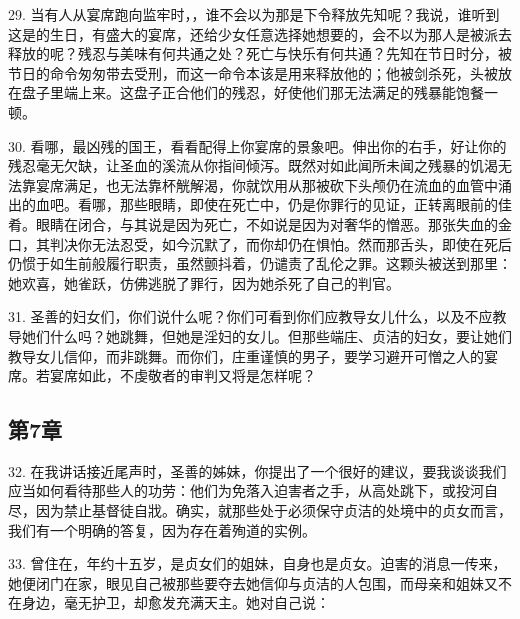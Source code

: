 29. 当有人从宴席跑向监牢时，，谁不会以为那是下令释放先知呢？我说，谁听到这是的生日，有盛大的宴席，还给少女任意选择她想要的，会不以为那人是被派去释放的呢？残忍与美味有何共通之处？死亡与快乐有何共通？先知在节日时分，被节日的命令匆匆带去受刑，而这一命令本该是用来释放他的；他被剑杀死，头被放在盘子里端上来。这盘子正合他们的残忍，好使他们那无法满足的残暴能饱餐一顿。\par

30. 看哪，最凶残的国王，看看配得上你宴席的景象吧。伸出你的右手，好让你的残忍毫无欠缺，让圣血的溪流从你指间倾泻。既然对如此闻所未闻之残暴的饥渴无法靠宴席满足，也无法靠杯觥解渴，你就饮用从那被砍下头颅仍在流血的血管中涌出的血吧。看哪，那些眼睛，即使在死亡中，仍是你罪行的见证，正转离眼前的佳肴。眼睛在闭合，与其说是因为死亡，不如说是因为对奢华的憎恶。那张失血的金口，其判决你无法忍受，如今沉默了，而你却仍在惧怕。然而那舌头，即使在死后仍惯于如生前般履行职责，虽然颤抖着，仍谴责了乱伦之罪。这颗头被送到那里：她欢喜，她雀跃，仿佛逃脱了罪行，因为她杀死了自己的判官。\par

31. 圣善的妇女们，你们说什么呢？你们可看到你们应教导女儿什么，以及不应教导她们什么吗？她跳舞，但她是淫妇的女儿。但那些端庄、贞洁的妇女，要让她们教导女儿信仰，而非跳舞。而你们，庄重谨慎的男子，要学习避开可憎之人的宴席。若宴席如此，不虔敬者的审判又将是怎样呢？\par


\subsection{第7章}

\par

32. 在我讲话接近尾声时，圣善的姊妹，你提出了一个很好的建议，要我谈谈我们应当如何看待那些人的功劳：他们为免落入迫害者之手，从高处跳下，或投河自尽，因为禁止基督徒自戕。确实，就那些处于必须保守贞洁的处境中的贞女而言，我们有一个明确的答复，因为存在着殉道的实例。\par

33. 曾住在，年约十五岁，是贞女们的姐妹，自身也是贞女。迫害的消息一传来，她便闭门在家，眼见自己被那些要夺去她信仰与贞洁的人包围，而母亲和姐妹又不在身边，毫无护卫，却愈发充满天主。她对自己说：\par

